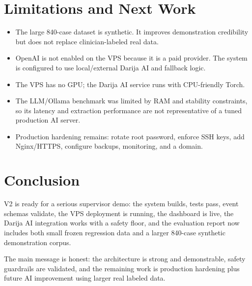\documentclass[11pt,a4paper]{article}
\begin{document}
\section{Limitations and Next Work}

\begin{itemize}
  \item The large 840-case dataset is synthetic. It improves demonstration credibility but does not replace clinician-labeled real data.
  \item OpenAI is not enabled on the VPS because it is a paid provider. The system is configured to use local/external Darija AI and fallback logic.
  \item The VPS has no GPU; the Darija AI service runs with CPU-friendly Torch.
  \item The LLM/Ollama benchmark was limited by RAM and stability constraints, so its latency and extraction performance are not representative of a tuned production AI server.
  \item Production hardening remains: rotate root password, enforce SSH keys, add Nginx/HTTPS, configure backups, monitoring, and a domain.
\end{itemize}

\section{Conclusion}

V2 is ready for a serious supervisor demo: the system builds, tests pass, event schemas validate, the VPS deployment is running, the dashboard is live, the Darija AI integration works with a safety floor, and the evaluation report now includes both small frozen regression data and a larger 840-case synthetic demonstration corpus.

The main message is honest: the architecture is strong and demonstrable, safety guardrails are validated, and the remaining work is production hardening plus future AI improvement using larger real labeled data.
\end{document}
